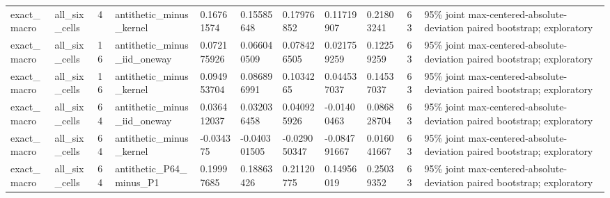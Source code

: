 \begin{tabular}{lllllllllll}
exact\_macro & all\_six\_cells & 4 & antithetic\_minus\_kernel & 0.16761574 & 0.15585648 & 0.17976852 & 0.11719907 & 0.21803241 & 63 & 95\% joint max-centered-absolute-deviation paired bootstrap; exploratory \\
exact\_macro & all\_six\_cells & 16 & antithetic\_minus\_iid\_oneway & 0.072175926 & 0.066040509 & 0.078426505 & 0.021759259 & 0.12259259 & 63 & 95\% joint max-centered-absolute-deviation paired bootstrap; exploratory \\
exact\_macro & all\_six\_cells & 16 & antithetic\_minus\_kernel & 0.094953704 & 0.086896991 & 0.1034265 & 0.044537037 & 0.14537037 & 63 & 95\% joint max-centered-absolute-deviation paired bootstrap; exploratory \\
exact\_macro & all\_six\_cells & 64 & antithetic\_minus\_iid\_oneway & 0.036412037 & 0.032036458 & 0.040925926 & -0.01400463 & 0.086828704 & 63 & 95\% joint max-centered-absolute-deviation paired bootstrap; exploratory \\
exact\_macro & all\_six\_cells & 64 & antithetic\_minus\_kernel & -0.034375 & -0.040301505 & -0.029050347 & -0.084791667 & 0.016041667 & 63 & 95\% joint max-centered-absolute-deviation paired bootstrap; exploratory \\
exact\_macro & all\_six\_cells & 64 & antithetic\_P64\_minus\_P1 & 0.19997685 & 0.18863426 & 0.21120775 & 0.14956019 & 0.25039352 & 63 & 95\% joint max-centered-absolute-deviation paired bootstrap; exploratory \\
\bottomrule
\end{tabular}
